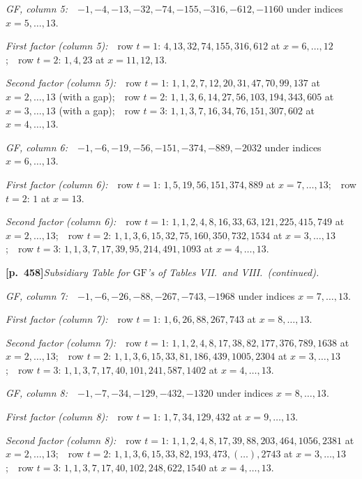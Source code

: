 \documentclass[11pt,a4paper]{article}
\providecommand{\GF}{\mathrm{GF}}
\begin{document}
\medskip

\noindent\textit{GF, column 5:}\ \ $-1,-4,-13,-32,-74,-155,-316,-612,-1160$ under indices $x=5,\ldots,13$.

\noindent\textit{First factor (column 5):}\ \ row $t=1$: $4,13,32,74,155,316,612$ at $x=6,\ldots,12$;\ \ row $t=2$: $1,4,23$ at $x=11,12,13$.

\noindent\textit{Second factor (column 5):}\ \ row $t=1$: $1,1,2,7,12,20,31,47,70,99,137$ at $x=2,\ldots,13$ (with a gap);\ \ row $t=2$: $1,1,3,6,14,27,56,103,194,343,605$ at $x=3,\ldots,13$ (with a gap);\ \ row $t=3$: $1,1,3,7,16,34,76,151,307,602$ at $x=4,\ldots,13$.

\medskip

\noindent\textit{GF, column 6:}\ \ $-1,-6,-19,-56,-151,-374,-889,-2032$ under indices $x=6,\ldots,13$.

\noindent\textit{First factor (column 6):}\ \ row $t=1$: $1,5,19,56,151,374,889$ at $x=7,\ldots,13$;\ \ row $t=2$: $1$ at $x=13$.

\noindent\textit{Second factor (column 6):}\ \ row $t=1$: $1,1,2,4,8,16,33,63,121,225,415,749$ at $x=2,\ldots,13$;\ \ row $t=2$: $1,1,3,6,15,32,75,160,350,732,1534$ at $x=3,\ldots,13$;\ \ row $t=3$: $1,1,3,7,17,39,95,214,491,1093$ at $x=4,\ldots,13$.

\bigskip
\noindent\textbf{[p.~458]}\quad\textit{Subsidiary Table for $\GF$'s of Tables VII.\ and VIII.\ (continued).}

\medskip

\noindent\textit{GF, column 7:}\ \ $-1,-6,-26,-88,-267,-743,-1968$ under indices $x=7,\ldots,13$.

\noindent\textit{First factor (column 7):}\ \ row $t=1$: $1,6,26,88,267,743$ at $x=8,\ldots,13$.

\noindent\textit{Second factor (column 7):}\ \ row $t=1$: $1,1,2,4,8,17,38,82,177,376,789,1638$ at $x=2,\ldots,13$;\ \ row $t=2$: $1,1,3,6,15,33,81,186,439,1005,2304$ at $x=3,\ldots,13$;\ \ row $t=3$: $1,1,3,7,17,40,101,241,587,1402$ at $x=4,\ldots,13$.

\medskip

\noindent\textit{GF, column 8:}\ \ $-1,-7,-34,-129,-432,-1320$ under indices $x=8,\ldots,13$.

\noindent\textit{First factor (column 8):}\ \ row $t=1$: $1,7,34,129,432$ at $x=9,\ldots,13$.

\noindent\textit{Second factor (column 8):}\ \ row $t=1$: $1,1,2,4,8,17,39,88,203,464,1056,2381$ at $x=2,\ldots,13$;\ \ row $t=2$: $1,1,3,6,15,33,82,193,473,(\ldots),2743$ at $x=3,\ldots,13$;\ \ row $t=3$: $1,1,3,7,17,40,102,248,622,1540$ at $x=4,\ldots,13$.
\end{document}
